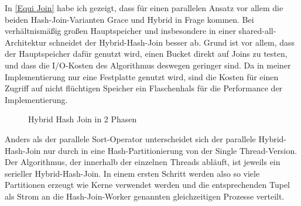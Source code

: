 \documentclass[a4paper,12pt,twoside]{article}
\begin{document}
In \autoref{Equi Join} habe ich gezeigt, dass für einen parallelen Ansatz vor allem die beiden Hash-Join-Varianten Grace und Hybrid in Frage kommen. Bei verhältnismäßig großen Hauptspeicher und insbesondere in einer shared-all-Architektur schneidet der Hybrid-Hash-Join besser ab. Grund ist vor allem, dass der Hauptspeicher dafür genutzt wird, einen Bucket direkt auf Joins zu testen, und dass die I/O-Kosten des Algorithmus deswegen geringer sind. Da in meiner Implementierung nur eine Festplatte genutzt wird, sind die Kosten für einen Zugriff auf nicht flüchtigen Speicher ein Flaschenhals für die Performance der Implementierung.

\begin{figure}
	\centering
	\qquad
	\caption{Hybrid Hash Join in 2 Phasen \autocite{Richly2009}}
	\label{img:hybrid}
\end{figure}

Anders als der parallele Sort-Operator unterscheidet sich der parallele Hybrid-Hash-Join nur durch in eine Hash-Partitionierung von der Single Thread-Version. Der Algorithmus, der innerhalb der einzelnen Threads abläuft, ist jeweils ein serieller Hybrid-Hash-Join. In einem ersten Schritt werden also so viele Partitionen erzeugt wie Kerne verwendet werden und die entsprechenden Tupel als Strom an die Hash-Join-Worker genannten gleichzeitigen Prozesse verteilt.
\end{document}
